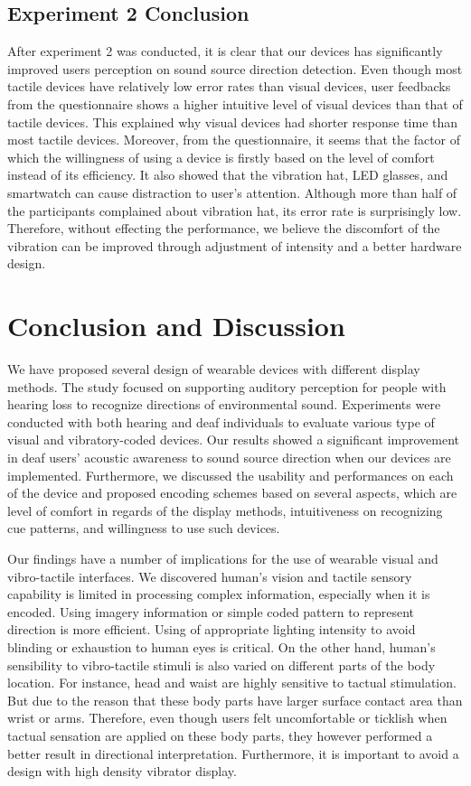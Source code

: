 \documentclass{sigchi}
\begin{document}
\subsection{Experiment 2 Conclusion}
After experiment 2 was conducted, it is clear that our devices has significantly improved users perception on sound source direction detection. Even though most tactile devices have relatively low error rates than visual devices, user feedbacks from the questionnaire shows a higher intuitive level of visual devices than that of tactile devices. This explained why visual devices had shorter response time than most tactile devices. Moreover, from the questionnaire, it seems that the factor of which the willingness of using a device is firstly based on the level of comfort instead of its efficiency. It also showed that the vibration hat, LED glasses, and smartwatch can cause distraction to user's attention. Although more than half of the participants complained about vibration hat, its error rate is surprisingly low. Therefore, without effecting the performance, we believe the discomfort of the vibration can be improved through adjustment of intensity and a better hardware design.

\section{Conclusion and Discussion}
We have proposed several design of wearable devices with different display methods. The study focused on supporting auditory perception for people with hearing loss to recognize directions of environmental sound. Experiments were conducted with both hearing and deaf individuals to evaluate various type of visual and vibratory-coded devices. Our results showed a significant improvement in deaf users' acoustic awareness to sound source direction when our devices are implemented. Furthermore, we discussed the usability and performances on each of the device and proposed encoding schemes based on several aspects, which are level of comfort in regards of the display methods, intuitiveness on recognizing cue patterns, and willingness to use such devices.

Our findings have a number of implications for the use of wearable visual and vibro-tactile interfaces. We discovered human's vision and tactile sensory capability is limited in processing complex information, especially when it is encoded. Using imagery information or simple coded pattern to represent direction is more efficient. Using of appropriate lighting intensity to avoid blinding or exhaustion to human eyes is critical. On the other hand, human's sensibility to vibro-tactile stimuli is also varied on different parts of the body location. For instance, head and waist are highly sensitive to tactual stimulation. But due to the reason that these body parts have larger surface contact area than wrist or arms. Therefore, even though users felt uncomfortable or ticklish when tactual sensation are applied on these body parts, they however performed a better result in directional interpretation. Furthermore, it is important to avoid a design with high density vibrator display.
\end{document}
